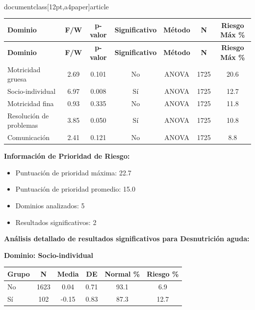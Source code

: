 \\documentclass[12pt,a4paper]{article}
\begin{document}
\begin{longtable}{|l|c|c|c|c|c|c|}
\hline
\textbf{Dominio} & \textbf{F/W} & \textbf{p-valor} & \textbf{Significativo} & \textbf{Método} & \textbf{N} & \textbf{Riesgo Máx \%} \\
\hline
\endfirsthead

\hline
\textbf{Dominio} & \textbf{F/W} & \textbf{p-valor} & \textbf{Significativo} & \textbf{Método} & \textbf{N} & \textbf{Riesgo Máx \%} \\
\hline
\endhead

\hline
\endfoot

\hline
\endlastfoot

Motricidad gruesa & 2.69 & 0.101 & No & ANOVA & 1725 & 20.6 \\
Socio-individual & 6.97 & 0.008 & Sí & ANOVA & 1725 & 12.7 \\
Motricidad fina & 0.93 & 0.335 & No & ANOVA & 1725 & 11.8 \\
Resolución de problemas & 3.85 & 0.050 & Sí & ANOVA & 1725 & 10.8 \\
Comunicación & 2.41 & 0.121 & No & ANOVA & 1725 & 8.8 \\

\end{longtable}


\textbf{Información de Prioridad de Riesgo:}
\begin{itemize}
\item Puntuación de prioridad máxima: 22.7
\item Puntuación de prioridad promedio: 15.0
\item Dominios analizados: 5
\item Resultados significativos: 2
\end{itemize}


\textbf{Análisis detallado de resultados significativos para Desnutrición aguda:}


\textbf{Dominio: Socio-individual}


\begin{center}
\begin{tabular}{|l|c|c|c|c|c|}
\hline
\textbf{Grupo} & \textbf{N} & \textbf{Media} & \textbf{DE} & \textbf{Normal \%} & \textbf{Riesgo \%} \\
\hline
No & 1623 & 0.04 & 0.71 & 93.1 & 6.9 \\
Sí & 102 & -0.15 & 0.83 & 87.3 & 12.7 \\

\hline
\end{tabular}
\end{center}
\end{document}
